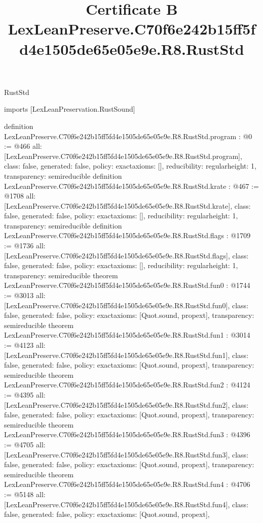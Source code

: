 \begin{lexlean}{RustStd}
\title{Certificate B LexLeanPreserve.C70f6e242b15ff5fd4e1505de65e05e9e.R8.RustStd}
\begin{coremodule}
imports [LexLeanPreservation.RustSound]

definition LexLeanPreserve.C70f6e242b15ff5fd4e1505de65e05e9e.R8.RustStd.program : @0 := @466 {
  all: [LexLeanPreserve.C70f6e242b15ff5fd4e1505de65e05e9e.R8.RustStd.program],
  class: false,
  generated: false,
  policy: exact{axioms: []},
  reducibility: regular{height: 1},
  transparency: semireducible
}
definition LexLeanPreserve.C70f6e242b15ff5fd4e1505de65e05e9e.R8.RustStd.krate : @467 := @1708 {
  all: [LexLeanPreserve.C70f6e242b15ff5fd4e1505de65e05e9e.R8.RustStd.krate],
  class: false,
  generated: false,
  policy: exact{axioms: []},
  reducibility: regular{height: 1},
  transparency: semireducible
}
definition LexLeanPreserve.C70f6e242b15ff5fd4e1505de65e05e9e.R8.RustStd.flags : @1709 := @1736 {
  all: [LexLeanPreserve.C70f6e242b15ff5fd4e1505de65e05e9e.R8.RustStd.flags],
  class: false,
  generated: false,
  policy: exact{axioms: []},
  reducibility: regular{height: 1},
  transparency: semireducible
}
theorem LexLeanPreserve.C70f6e242b15ff5fd4e1505de65e05e9e.R8.RustStd.fun0 : @1744 := @3013 {
  all: [LexLeanPreserve.C70f6e242b15ff5fd4e1505de65e05e9e.R8.RustStd.fun0],
  class: false,
  generated: false,
  policy: exact{axioms: [Quot.sound, propext]},
  transparency: semireducible
}
theorem LexLeanPreserve.C70f6e242b15ff5fd4e1505de65e05e9e.R8.RustStd.fun1 : @3014 := @4123 {
  all: [LexLeanPreserve.C70f6e242b15ff5fd4e1505de65e05e9e.R8.RustStd.fun1],
  class: false,
  generated: false,
  policy: exact{axioms: [Quot.sound, propext]},
  transparency: semireducible
}
theorem LexLeanPreserve.C70f6e242b15ff5fd4e1505de65e05e9e.R8.RustStd.fun2 : @4124 := @4395 {
  all: [LexLeanPreserve.C70f6e242b15ff5fd4e1505de65e05e9e.R8.RustStd.fun2],
  class: false,
  generated: false,
  policy: exact{axioms: [Quot.sound, propext]},
  transparency: semireducible
}
theorem LexLeanPreserve.C70f6e242b15ff5fd4e1505de65e05e9e.R8.RustStd.fun3 : @4396 := @4705 {
  all: [LexLeanPreserve.C70f6e242b15ff5fd4e1505de65e05e9e.R8.RustStd.fun3],
  class: false,
  generated: false,
  policy: exact{axioms: [Quot.sound, propext]},
  transparency: semireducible
}
theorem LexLeanPreserve.C70f6e242b15ff5fd4e1505de65e05e9e.R8.RustStd.fun4 : @4706 := @5148 {
  all: [LexLeanPreserve.C70f6e242b15ff5fd4e1505de65e05e9e.R8.RustStd.fun4],
  class: false,
  generated: false,
  policy: exact{axioms: [Quot.sound, propext]},
}
\end{coremodule}
\end{lexlean}
